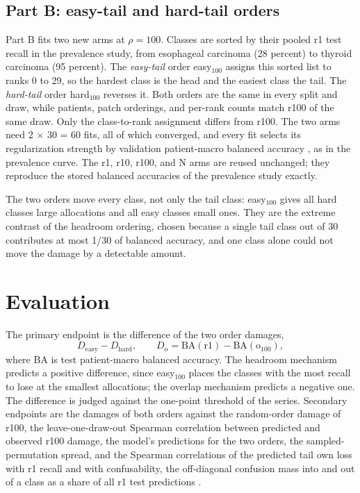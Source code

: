 \documentclass[11pt]{article}
\begin{document}
\subsection{Part B: easy-tail and hard-tail orders}
\label{sec:orders}
Part B fits two new arms at $\rho=100$. Classes are sorted by their pooled r1 test recall in the prevalence study, from esophageal carcinoma (28 percent) to thyroid carcinoma (95 percent). The \emph{easy-tail} order easy$_{100}$ assigns this sorted list to ranks 0 to 29, so the hardest class is the head and the easiest class the tail. The \emph{hard-tail} order hard$_{100}$ reverses it. Both orders are the same in every split and draw, while patients, patch orderings, and per-rank counts match r100 of the same draw. Only the class-to-rank assignment differs from r100. The two arms need 2 $\times$ 30 = 60 fits, all of which converged, and every fit selects its regularization strength by validation patient-macro balanced accuracy \citep{queisler2026patientShortage}, as in the prevalence curve. The r1, r10, r100, and N arms are reused unchanged; they reproduce the stored balanced accuracies of the prevalence study exactly.

The two orders move every class, not only the tail class: easy$_{100}$ gives all hard classes large allocations and all easy classes small ones. They are the extreme contrast of the headroom ordering, chosen because a single tail class out of 30 contributes at most 1/30 of balanced accuracy, and one class alone could not move the damage by a detectable amount.

\section{Evaluation}
\label{sec:evaluation}
The primary endpoint is the difference of the two order damages,
\begin{equation}
  D_{\text{easy}} - D_{\text{hard}}, \qquad D_{\text{o}} = \mathrm{BA}(\text{r1}) - \mathrm{BA}(\text{o}_{100}),
  \label{eq:contrast}
\end{equation}
\noindent where BA is test patient-macro balanced accuracy. The headroom mechanism predicts a positive difference, since easy$_{100}$ places the classes with the most recall to lose at the smallest allocations; the overlap mechanism predicts a negative one. The difference is judged against the one-point threshold of the series. Secondary endpoints are the damages of both orders against the random-order damage of r100, the leave-one-draw-out Spearman correlation between predicted and observed r100 damage, the model's predictions for the two orders, the sampled-permutation spread, and the Spearman correlations of the predicted tail own loss with r1 recall and with confusability, the off-diagonal confusion mass into and out of a class as a share of all r1 test predictions \citep{queisler2026tailBracs}.
\end{document}

